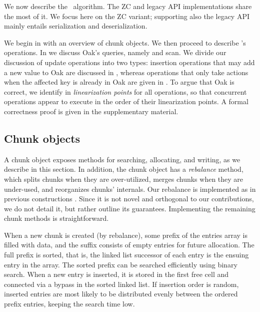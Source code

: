 
\setlength{\textfloatsep}{0.75\baselineskip}

We now describe the \oak\ algorithm. The ZC  and  legacy  API implementations share the most of it. 
We focus here on the ZC variant; supporting also the legacy API mainly entails serialization and deserialization.

We begin in  with an overview  of  chunk objects.  We then proceed to describe  \oak's operations.
In  
we discuss Oak's queries, namely  and scan.
We divide our discussion of update operations into two types: insertion operations that may add a new value to Oak are discussed in 
, whereas operations that only take actions  when the affected key is already in Oak are given in 
.
To argue that Oak is correct, we identify  in  \emph{linearization points} for all operations, so that concurrent operations appear to execute in the order of their linearization points. 
A formal correctness proof is given in the supplementary material. 


\subsection{Chunk objects}
\label{ssec:chunks}


A chunk object exposes methods for searching, allocating, and writing, as we describe in this section.
In addition, the chunk object has a  \emph{rebalance} method, which splits chunks when they are over-utilized, merges chunks when they are under-used, and reorganizes chunks' internals. 
Our rebalance is implemented as in previous   constructions \cite{kiwi,Braginsky-BTree}.
Since it is not novel and orthogonal to our contributions, we do not detail it, but rather outline its guarantees.
Implementing the remaining chunk methods is straightforward.

When a new chunk is created (by rebalance), some prefix of the entries array is filled with data, and the suffix consists of empty entries for future allocation. 
The full prefix is  sorted, that is, the linked list successor of each entry is the ensuing entry in the array. The sorted prefix can be searched efficiently using binary search. 
When a new entry is inserted, it is stored in the first free cell and connected via a bypass in the sorted linked list. If insertion order is random, inserted entries are most likely to be distributed evenly between the ordered prefix entries, keeping the search time low. %

